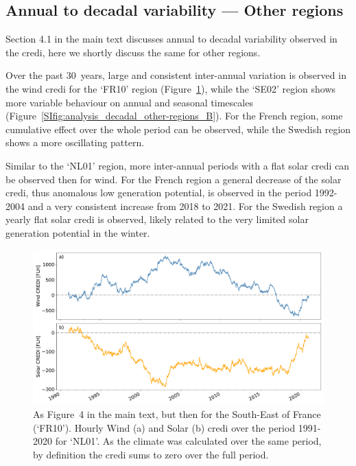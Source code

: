 \documentclass[12pt]{iopart}
\newcommand{\credi}[0]{{\sc credi}}
\newcommand{\sdi}[0]{{\sc solar credi}}
\newcommand{\wdi}[0]{{\sc wind credi}}
\begin{document}
\clearpage
\subsection{Annual to decadal variability --- Other regions}
Section 4.1 in the main text discusses annual to decadal variability observed in the \credi{}, here we shortly discuss the same for other regions. 

Over the past 30~years, large and consistent inter-annual variation is observed in the \wdi{} for the `FR10' region (Figure~\ref{SIfig:analysis_decadal_other-regions_A}), while the `SE02' region shows more variable behaviour on annual and seasonal timescales (Figure~\ref{SIfig:analysis_decadal_other-regions_B}).
For the French region, some cumulative effect over the whole period can be observed, while the Swedish region shows a more oscillating pattern. 

Similar to the `NL01' region, more inter-annual periods with a flat \sdi{} can be observed then for wind. 
For the French region a general decrease of the \sdi, thus anomalous low generation potential, is observed in the period 1992-2004 and a very consistent increase from 2018 to 2021.
For the Swedish region a yearly flat \sdi{} is observed, likely related to the very limited solar generation potential in the winter. 

\begin{figure}[hb]
    \centering
    \includegraphics[width=\textwidth]{additional_regions/CREDI_interannual_FR10.pdf}
    \caption{
        As Figure~4 in the main text, but then for the South-East of France (`FR10').
        Hourly Wind (a) and Solar (b) \credi{} over the period 1991-2020 for `NL01'. 
        As the climate was calculated over the same period, by definition the \credi{} sums to zero over the full period.}
    \label{SIfig:analysis_decadal_other-regions_A}
\end{figure}
\end{document}

